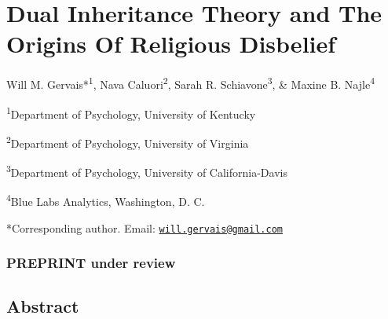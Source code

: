 \documentclass[]{article}
\title{}
\author{}
\date{}
\begin{document}
\hypertarget{dual-inheritance-theory-and-the-origins-of-religious-disbelief}{%
\section{Dual Inheritance Theory and The Origins Of Religious
Disbelief}\label{dual-inheritance-theory-and-the-origins-of-religious-disbelief}}

Will M. Gervais*\textsuperscript{1}, Nava Caluori\textsuperscript{2},
Sarah R. Schiavone\textsuperscript{3}, \& Maxine B.
Najle\textsuperscript{4}

\scriptsize

\textsuperscript{1}Department of Psychology, University of Kentucky

\textsuperscript{2}Department of Psychology, University of Virginia

\textsuperscript{3}Department of Psychology, University of
California-Davis

\textsuperscript{4}Blue Labs Analytics, Washington, D. C.

*Corresponding author. Email:
\href{mailto:will.gervais@gmail.com}{\nolinkurl{will.gervais@gmail.com}}

\hypertarget{preprint-under-review}{%
\subsubsection{PREPRINT under review}\label{preprint-under-review}}

\normalsize
\pagebreak

\hypertarget{abstract}{%
\subsection{Abstract}\label{abstract}}
\end{document}
